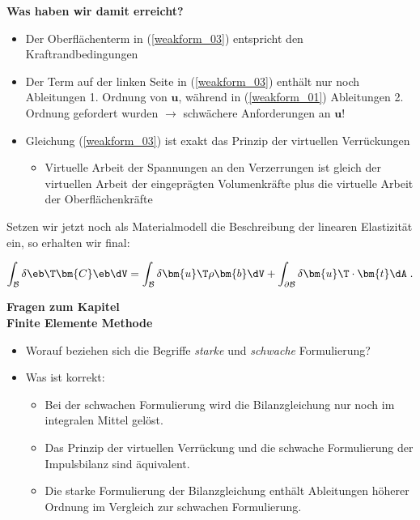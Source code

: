 \begin{framed}
\textbf{Was haben wir damit erreicht?}\\
\begin{itemize}
\item Der Oberflächenterm in (\ref{weakform_03}) entspricht den Kraftrandbedingungen
\item Der Term auf der linken Seite in (\ref{weakform_03}) enthält nur noch Ableitungen 1. Ordnung von $\bm{u}$, während in (\ref{weakform_01}) Ableitungen 2. Ordnung gefordert wurden $\rightarrow$ schwächere Anforderungen an $\bm{u}$!
\item Gleichung (\ref{weakform_03}) ist exakt das Prinzip der virtuellen Verrückungen\begin{itemize}
\item Virtuelle Arbeit der Spannungen an den Verzerrungen ist gleich der virtuellen Arbeit der eingeprägten Volumenkräfte plus die virtuelle Arbeit der Oberflächenkräfte
\end{itemize}
\end{itemize}
\end{framed}

Setzen wir jetzt noch als Materialmodell die Beschreibung der linearen Elastizität ein, so erhalten wir final:

\begin{equation}
\label{weakform_04}
\int_{\mathcal{B}} \delta\eb\T \bm{C} \eb \dV = \int_{\mathcal{B}} \delta \bm{u}\T \rho \bm{b} \dV + \int_{\partial\mathcal{B}} \delta \bm{u}\T \cdot \bm{t} \dA \; .
\end{equation}

\begin{framed}
\textbf{Fragen zum Kapitel}\\
\textbf{Finite Elemente Methode}

\begin{itemize}
\item Worauf beziehen sich die Begriffe \textit{starke} und \textit{schwache} Formulierung?
\item Was ist korrekt:\begin{itemize}
\item Bei der schwachen Formulierung wird die Bilanzgleichung nur noch im integralen Mittel gelöst.
\item Das Prinzip der virtuellen Verrückung und die schwache Formulierung der Impulsbilanz sind äquivalent.
\item Die starke Formulierung der Bilanzgleichung enthält Ableitungen höherer Ordnung im Vergleich zur schwachen Formulierung.
\end{itemize}
\end{itemize}
\end{framed}